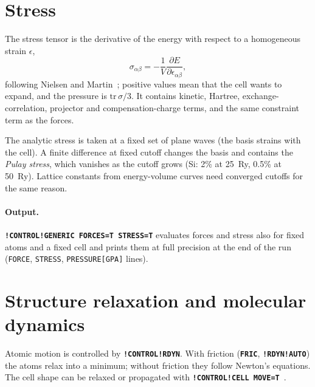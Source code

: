 \documentclass[11pt,a4paper,oneside]{book}
\newcommand{\key}[1]{\textbf{\texttt{#1}}}
\begin{document}
\section{Stress}\label{sec:stress}

The stress tensor is the derivative of the energy with respect to a
homogeneous strain $\epsilon$,
\begin{equation}
  \sigma_{\alpha\beta}=-\frac1V\frac{\partial E}{\partial\epsilon_{\alpha\beta}},
\end{equation}
following Nielsen and Martin~\cite{NielsenMartin1985}; positive values
mean that the cell wants to expand, and the pressure is
$\mathrm{tr}\,\sigma/3$. It contains kinetic, Hartree, exchange-correlation,
projector and compensation-charge terms, and the same constraint term as
the forces.

The analytic stress is taken at a fixed set of plane waves (the basis
strains with the cell). A finite difference at fixed cutoff changes the
basis and contains the \emph{Pulay stress}, which vanishes as the cutoff
grows (Si: 2\% at 25~Ry, 0.5\% at 50~Ry). Lattice constants from
energy-volume curves need converged cutoffs for the same reason.

\paragraph{Output.} \key{!CONTROL!GENERIC FORCES=T STRESS=T} evaluates
forces and stress also for fixed atoms and a fixed cell and prints them at
full precision at the end of the run (\texttt{FORCE}, \texttt{STRESS},
\texttt{PRESSURE[GPA]} lines).

\section{Structure relaxation and molecular dynamics}

Atomic motion is controlled by \key{!CONTROL!RDYN}. With friction
(\key{FRIC}, \key{!RDYN!AUTO}) the atoms relax into a minimum; without
friction they follow Newton's equations. The cell shape can be relaxed or
propagated with \key{!CONTROL!CELL MOVE=T}~\cite{NielsenMartin1985}.
\end{document}
